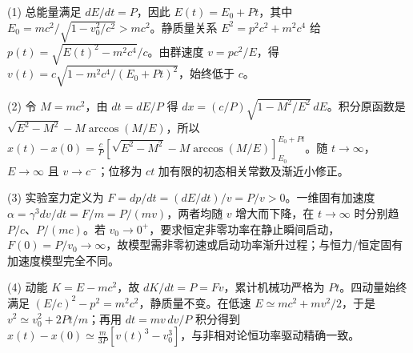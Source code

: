(1) 总能量满足 \(dE/dt=P\)，因此 \(E(t)=E_0+Pt\)，其中 \(E_0=mc^2/\sqrt{1-v_0^2/c^2}>mc^2\)。静质量关系 \(E^2=p^2c^2+m^2c^4\) 给 \(p(t)=\sqrt{E(t)^2-m^2c^4}/c\)。由群速度 \(v=pc^2/E\)，得 \(\boxed{v(t)=c\sqrt{1-m^2c^4/(E_0+Pt)^2}}\)，始终低于 \(c\)。

(2) 令 \(M=mc^2\)，由 \(dt=dE/P\) 得 \(dx=(c/P)\sqrt{1-M^2/E^2}\,dE\)。积分原函数是 \(\sqrt{E^2-M^2}-M\arccos(M/E)\)，所以 \(\boxed{x(t)-x(0)=\frac cP[\sqrt{E^2-M^2}-M\arccos(M/E)]_{E_0}^{E_0+Pt}}\)。随 \(t\to\infty\)，\(E\to\infty\) 且 \(v\to c^-\)；位移为 \(ct\) 加有限的初态相关常数及渐近小修正。

(3) 实验室力定义为 \(F=dp/dt=(dE/dt)/v=P/v>0\)。一维固有加速度 \(\alpha=\gamma^3dv/dt=F/m=P/(mv)\)，两者均随 \(v\) 增大而下降，在 \(t\to\infty\) 时分别趋 \(P/c\)、\(P/(mc)\)。若 \(v_0\to0^+\)，要求恒定非零功率在静止瞬间启动，\(F(0)=P/v_0\to\infty\)，故模型需非零初速或启动功率渐升过程；与恒力/恒定固有加速度模型完全不同。

(4) 动能 \(K=E-mc^2\)，故 \(dK/dt=P=Fv\)，累计机械功严格为 \(Pt\)。四动量始终满足 \((E/c)^2-p^2=m^2c^2\)，静质量不变。在低速 \(E\simeq mc^2+mv^2/2\)，于是 \(v^2\simeq v_0^2+2Pt/m\)；再用 \(dt=mv\,dv/P\) 积分得到 \(\boxed{x(t)-x(0)\simeq\frac m{3P}[v(t)^3-v_0^3]}\)，与非相对论恒功率驱动精确一致。
